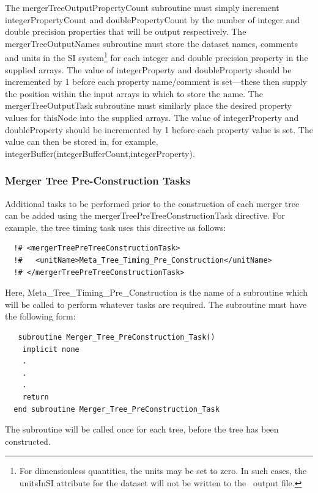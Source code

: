 The {\normalfont \ttfamily mergerTreeOutputPropertyCount} subroutine must simply increment {\normalfont \ttfamily integerPropertyCount} and {\normalfont \ttfamily doublePropertyCount} by the number of integer and double precision properties that will be output respectively. The {\normalfont \ttfamily mergerTreeOutputNames} subroutine must store the dataset names, comments and units in the SI system\footnote{For dimensionless quantities, the units may be set to zero. In such cases, the {\normalfont \ttfamily unitsInSI} attribute for the dataset will not be written to the \protect\glc\ output file.} for each integer and double precision property in the supplied arrays. The value of {\normalfont \ttfamily integerProperty} and {\normalfont \ttfamily doubleProperty} should be incremented by 1 before each property name/comment is set---these then supply the position within the input arrays in which to store the name. The {\normalfont \ttfamily mergerTreeOutputTask} subroutine must similarly place the desired property values for {\normalfont \ttfamily thisNode} into the supplied arrays. The value of {\normalfont \ttfamily integerProperty} and {\normalfont \ttfamily doubleProperty} should be incremented by 1 
before each property value is set. The value can then be stored in, for example, {\normalfont \ttfamily integerBuffer(integerBufferCount,integerProperty)}.

\subsubsection{Merger Tree Pre-Construction Tasks}\label{sec:MergerTreePreConstructionTask}

Additional tasks to be performed prior to the construction of each merger tree can be added using the {\normalfont \ttfamily mergerTreePreTreeConstructionTask} directive. For example, the tree timing task uses this directive as follows:
\begin{verbatim}
  !# <mergerTreePreTreeConstructionTask>
  !#   <unitName>Meta_Tree_Timing_Pre_Construction</unitName>
  !# </mergerTreePreTreeConstructionTask>
\end{verbatim}
Here, {\normalfont \ttfamily Meta\_Tree\_Timing\_Pre\_Construction} is the name of a subroutine which will be called to perform whatever tasks are required. The subroutine must have the following form:
\begin{verbatim}
   subroutine Merger_Tree_PreConstruction_Task()
    implicit none
    .
    .
    .
    return
  end subroutine Merger_Tree_PreConstruction_Task
\end{verbatim}
The subroutine will be called once for each tree, before the tree has been constructed.


